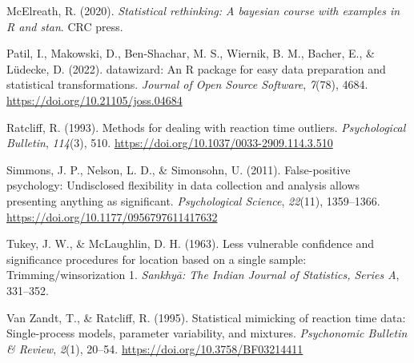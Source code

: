 \documentclass{article}
\newlength{\cslhangindent}
\newlength{\cslentryspacingunit} %
\newenvironment{CSLReferences}[2] %
 {%
  \setlength{\parindent}{0pt}
  \ifodd #1
  \let\oldpar\par
  \def\par{\hangindent=\cslhangindent\oldpar}
  \fi
  \setlength{\parskip}{#2\cslentryspacingunit}
 }%
 {}
\begin{document}
\begin{CSLReferences}{1}{0}
\leavevmode{}%
McElreath, R. (2020). \emph{Statistical rethinking: A bayesian course
with examples in {R} and stan}. CRC press.

\leavevmode{}%
Patil, I., Makowski, D., Ben-Shachar, M. S., Wiernik, B. M., Bacher, E.,
\& Lüdecke, D. (2022). {datawizard}: An {R} package for easy data
preparation and statistical transformations. \emph{Journal of Open
Source Software}, \emph{7}(78), 4684.
\url{https://doi.org/10.21105/joss.04684}

\leavevmode{}%
Ratcliff, R. (1993). Methods for dealing with reaction time outliers.
\emph{Psychological Bulletin}, \emph{114}(3), 510.
\url{https://doi.org/10.1037/0033-2909.114.3.510}

\leavevmode{}%
Simmons, J. P., Nelson, L. D., \& Simonsohn, U. (2011). False-positive
psychology: Undisclosed flexibility in data collection and analysis
allows presenting anything as significant. \emph{Psychological Science},
\emph{22}(11), 1359--1366.
\url{https://doi.org/10.1177/0956797611417632}

\leavevmode{}%
Tukey, J. W., \& McLaughlin, D. H. (1963). Less vulnerable confidence
and significance procedures for location based on a single sample:
Trimming/winsorization 1. \emph{Sankhy{ā}: The Indian Journal of
Statistics, Series A}, 331--352.

\leavevmode{}%
Van Zandt, T., \& Ratcliff, R. (1995). Statistical mimicking of reaction
time data: Single-process models, parameter variability, and mixtures.
\emph{Psychonomic Bulletin \& Review}, \emph{2}(1), 20--54.
\url{https://doi.org/10.3758/BF03214411}

\end{CSLReferences}



\end{document}
